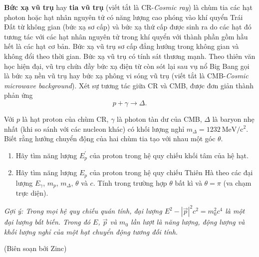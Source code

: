 \textbf{Bức xạ vũ trụ} hay \textbf{tia vũ trụ} (viết tắt là CR-\textit{Cosmic ray}) là chùm tia các hạt photon hoặc hạt nhân nguyên tử có năng lượng cao phóng vào khí quyển Trái Đất từ không gian (bức xạ sơ cấp) và bức xạ thứ cấp được sinh ra do các hạt đó tương tác với các hạt nhân nguyên tử trong khí quyển với thành phần gồm hầu hết là các hạt cơ bản. Bức xạ vũ trụ sơ cấp đẳng hướng trong không gian và không đổi theo thời gian. Bức xạ vũ trụ có tính sát thương mạnh. Theo thiên văn học hiện đại, vũ trụ chứa đầy bức xạ điện từ còn sót lại sau vụ nổ Big Bang gọi là bức xạ nền vũ trụ hay bức xạ phông vi sóng vũ trụ (viết tắt là CMB-\textit{Cosmic microwave background}). Xét sự tương tác giữa CR và CMB, được đơn giản thành phản ứng 
$$p + \gamma \rightarrow \Delta.$$

Với $p$ là hạt proton của chùm CR, $\gamma$ là photon tàn dư của CMB, $\Delta$ là baryon nhẹ nhất (khi so sánh với các nucleon khác) có khối lượng nghỉ $m_\Delta = 1232  \mathrm{~MeV/c^2}$. Biết rằng hướng chuyển động của hai chùm tia tạo với nhau một góc $\theta$.

\begin{enumerate}[label=\textbf{\alph*,}]\itemsep0em
    \item Hãy tìm năng lượng $E_p^\prime$ của proton trong hệ quy chiếu khối tâm của hệ hạt.
    \item Hãy tìm năng lượng $E_p$ của proton trong hệ quy chiếu Thiên Hà theo các đại lượng $E_\gamma$, $m_p$, $m_\Delta$, $\theta$ và $c$. Tính trong trường hợp $\theta$ bất kì và $\theta = \pi$ (va chạm trực diện).
\end{enumerate}


\textit{Gợi ý: Trong mọi hệ quy chiếu quán tính, đại lượng $E^2 - |\Vec{p}|^2 c^2 = m_0^2 c^4$ là một đại lượng bất biến. Trong đó $E$, $\Vec{p}$ và $m_0$ lần lượt là năng lượng, động lượng và khối lượng nghỉ của một hạt chuyển động tương đối tính.}

\begin{flushright}
    (Biên soạn bởi Zinc)
\end{flushright}